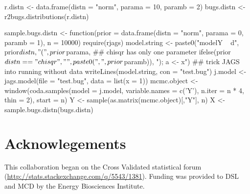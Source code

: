 \begin{example}

r.distn <- data.frame(distn = "norm", parama = 10, paramb = 2)
bugs.distn <- r2bugs.distributions(r.distn)
   
sample.bugs.distn <- function(prior = data.frame(distn = "norm", parama = 0, paramb = 1), n = 10000) {
  require(rjags)
  model.string <- paste0("model{Y ~ d", prior$distn, 
                         "(", prior$parama, 
                         ## chisqr has only one parameter
                         ifelse(prior$distn == "chisqr", "", paste0(", ", prior$paramb)), 
                         "); a <- x}")  ## trick JAGS into running without data  
  writeLines(model.string, con = "test.bug")
  j.model  <- jags.model(file = "test.bug", data = list(x = 1))
  mcmc.object <- window(coda.samples(model = j.model, 
       variable.names = c('Y'), n.iter = n * 4, thin = 2),
                        start = n)
  Y <- sample(as.matrix(mcmc.object)[,"Y"], n)
}
X <- sample.bugs.distn(bugs.distn)
\end{example}

\section{Acknowlegements}

This collaboration began on the Cross Validated statistical forum (\url{http://stats.stackexchange.com/q/5543/1381}). Funding was provided to DSL and MCD by the Energy Biosciences Institute.




\address{David S.\ LeBauer\\
Energy Biosciences Institute\\
University of Illinois\\
USA}\\

\address{Michael C.\ Dietze\\
Department of Earth And Environment\\
Boston University\\
USA}

\address{Benjamin M.\ Bolker\\
Department of Mathematics \& Statistics\\
McMaster University\\
Canada}
